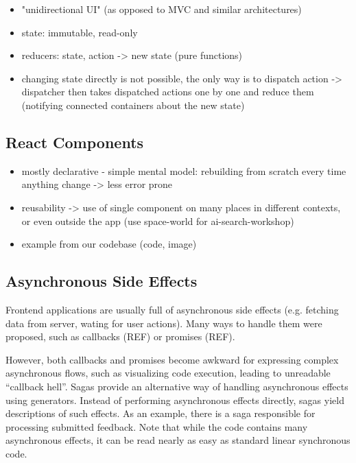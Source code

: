\begin{itemize}
\item "unidirectional UI" (as opposed to MVC and similar architectures)
\item state: immutable, read-only
\item reducers: state, action -> new state (pure functions)
\item changing state directly is not possible, the only way is to dispatch action -> dispatcher then takes dispatched actions one by one and reduce them (notifying connected containers about the new state)
\end{itemize}

\subsection{React Components}

\begin{itemize}
\item mostly declarative - simple mental model: rebuilding from scratch every time anything change -> less error prone
\item reusability -> use of single component on many places in different contexts,
  or even outside the app (use space-world for ai-search-workshop)
\item example from our codebase (code, image)
\end{itemize}

\subsection{Asynchronous Side Effects}
\label{sec:robomission-asynchronous-side-effects}

Frontend applications are usually full of asynchronous side effects
(e.g. fetching data from server, wating for user actions).
Many ways to handle them were proposed,
such as callbacks (REF) or promises (REF).

However, both callbacks and promises become awkward for expressing complex
asynchronous flows, such as visualizing code execution,
leading to unreadable ``callback hell''. %
Sagas provide an alternative way of handling asynchronous effects using generators.
Instead of performing asynchronous effects directly, sagas yield
descriptions of such effects.
As an example, there is a saga responsible for processing
submitted feedback.
Note that while the code contains many asynchronous effects,
it can be read nearly as easy as standard linear synchronous code.

